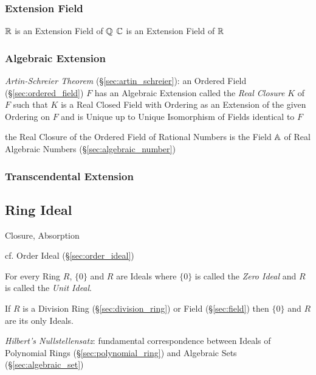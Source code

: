 \subsubsection{Extension Field}\label{sec:extension_field}

$\mathbb{R}$ is an Extension Field of $\mathbb{Q}$
$\mathbb{C}$ is an Extension Field of $\mathbb{R}$



\subsubsection{Algebraic Extension}\label{sec:algebraic_extension}

\emph{Artin-Schreier Theorem} (\S\ref{sec:artin_schreier}): an Ordered Field
(\S\ref{sec:ordered_field}) $F$ has an Algebraic Extension called the
\emph{Real Closure} $K$ of $F$ such that $K$ is a Real Closed Field with
Ordering as an Extension of the given Ordering on $F$ and is Unique up to
Unique Isomorphism of Fields identical to $F$

the Real Closure of the Ordered Field of Rational Numbers is the Field $\mathbb{A}$
of Real Algebraic Numbers (\S\ref{sec:algebraic_number})



\subsubsection{Transcendental Extension}
\label{sec:transcendental_extension}



\subsection{Ring Ideal}\label{sec:ring_ideal}

Closure, Absorption

\fist cf. Order Ideal (\S\ref{sec:order_ideal})

For every Ring $R$, $\{0\}$ and $R$ are Ideals where $\{0\}$ is called
the \emph{Zero Ideal} and $R$ is called the \emph{Unit Ideal}.

If $R$ is a Division Ring (\S\ref{sec:division_ring}) or Field
(\S\ref{sec:field}) then $\{0\}$ and $R$ are its only Ideals.

\emph{Hilbert's Nullstellensatz}: fundamental correspondence between Ideals of
Polynomial Rings (\S\ref{sec:polynomial_ring}) and Algebraic Sets
(\S\ref{sec:algebraic_set})



